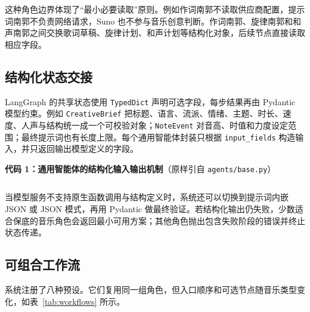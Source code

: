 \documentclass{SYSUReport}
\begin{document}
这种角色边界体现了“最小必要读取”原则。例如作词南郭不读取供应商配置，提示词南郭不负责网络请求，Suno 也不参与音乐创意判断。作词南郭、旋律南郭和和声南郭之间交换歌词草稿、旋律计划、和声计划等结构化对象，后续节点直接读取相应字段。

\subsection{结构化状态交接}

LangGraph 的共享状态使用 \verb|TypedDict| 声明可选字段，每步结果再由 Pydantic 模型约束。例如 \verb|CreativeBrief| 把标题、语言、流派、情绪、主题、时长、速度、人声与结构统一成一个可校验对象；\verb|NoteEvent| 对音高、时值和力度设定范围；最终提示词也有长度上限。每个通用智能体封装只根据 \verb|input_fields| 构造输入，并只返回输出模型定义的字段。

\noindent\textbf{代码 1：通用智能体的结构化输入输出机制}（原样引自 \verb|agents/base.py|）
\inputminted[firstline=78,lastline=120]{python}{../agents/base.py}

当模型服务不支持原生函数调用与结构定义时，系统还可以切换到提示词内嵌 JSON 或 JSON 模式，再用 Pydantic 做最终验证。若结构化输出仍失败，少数适合保底的音乐角色会返回最小可用方案；其他角色抛出包含失败阶段的错误并终止状态传递。

\subsection{可组合工作流}

系统注册了八种预设。它们复用同一组角色，但入口顺序和可选节点随音乐类型变化，如表~\ref{tab:workflows} 所示。
\end{document}
